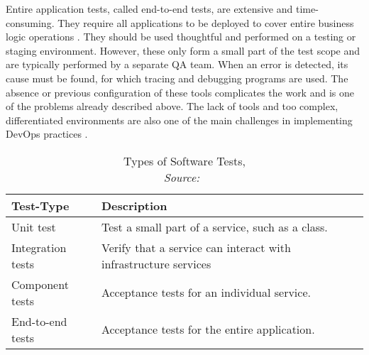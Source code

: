         Entire application tests, called end-to-end tests, are extensive and time-consuming. They require all applications to be deployed to cover entire business logic operations \cite{microtest}. They should be used thoughtful and performed on a testing or staging environment. However, these only form a small part of the test scope and are typically performed by a separate \ac{QA} team. When an error is detected, its cause must be found, for which tracing and debugging programs are used. The absence or previous configuration of these tools complicates the work and is one of the problems already described above. The lack of tools and too complex, differentiated environments are also one of the main challenges in implementing DevOps practices \cite{devops_challenge}.

        \begin{table}
            \centering
            \begin{tabularx}{0.9\textwidth}{lX}
                Test-Type & Description \\ \midrule\midrule
                Unit test& Test a small part of a service, such as a class.\\
                Integration tests & Verify that a service can interact with infrastructure services \\
                Component tests & Acceptance tests for an individual service. \\
                End-to-end tests & Acceptance tests for the entire application.
            \end{tabularx}
            \caption{Types of Software Tests, \\\textit{Source:~\cite{microtest}}}\label{tab::tests}
        \end{table}

